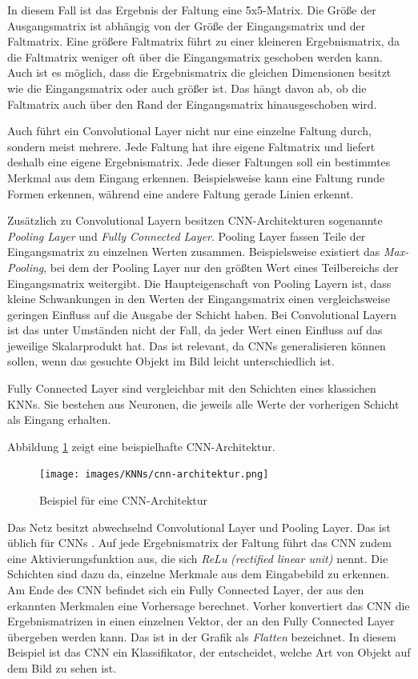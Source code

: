 In diesem Fall ist das Ergebnis der Faltung eine 5x5-Matrix. Die Größe der Ausgangsmatrix ist abhängig von der Größe der Eingangsmatrix und der Faltmatrix. Eine größere Faltmatrix führt zu einer kleineren Ergebnismatrix, da die Faltmatrix weniger oft über die Eingangsmatrix geschoben werden kann. Auch ist es möglich, dass die Ergebnismatrix die gleichen Dimensionen besitzt wie die Eingangsmatrix oder auch größer ist. Das hängt davon ab, ob die Faltmatrix auch über den Rand der Eingangsmatrix hinausgeschoben wird. \cite{knnsKompakt}

Auch führt ein Convolutional Layer nicht nur eine einzelne Faltung durch, sondern meist mehrere. Jede Faltung hat ihre eigene Faltmatrix und liefert deshalb eine eigene Ergebnismatrix. Jede dieser Faltungen soll ein bestimmtes Merkmal aus dem Eingang erkennen. Beispielsweise kann eine Faltung runde Formen erkennen, während eine andere Faltung gerade Linien erkennt. 

Zusätzlich zu Convolutional Layern besitzen \ac{CNN}-Architekturen sogenannte \emph{Pooling Layer} und \emph{Fully Connected Layer}. Pooling Layer fassen Teile der Eingangsmatrix zu einzelnen Werten zusammen. Beispielsweise existiert das \emph{Max-Pooling}, bei dem der Pooling Layer nur den größten Wert eines Teilbereichs der Eingangsmatrix weitergibt. Die Haupteigenschaft von Pooling Layern ist, dass kleine Schwankungen in den Werten der Eingangsmatrix einen vergleichsweise geringen Einfluss auf die Ausgabe der Schicht haben. Bei Convolutional Layern ist das unter Umständen nicht der Fall, da jeder Wert einen Einfluss auf das jeweilige Skalarprodukt hat. Das ist relevant, da \acp{CNN} generalisieren können sollen, wenn das gesuchte Objekt im Bild leicht unterschiedlich ist. \cite{DeepLearningBook}

Fully Connected Layer sind vergleichbar mit den Schichten eines klassichen \acp{KNN}. Sie bestehen aus Neuronen, die jeweils alle Werte der vorherigen Schicht als Eingang erhalten. \cite{DeepLearningBook}

Abbildung \ref{fig:cnn-architecture} zeigt eine beispielhafte \ac{CNN}-Architektur. 
\begin{figure}[h]
   \centering
   \texttt{[image: images/KNNs/cnn-architektur.png]}
   \caption{Beispiel für eine \ac{CNN}-Architektur \emph{\cite{cnn-architektur-img}}}
   \label{fig:cnn-architecture}
\end{figure}
Das Netz besitzt abwechselnd Convolutional Layer und Pooling Layer. Das ist üblich für \acp{CNN} \cite{DeepLearningBook}. Auf jede Ergebnismatrix der Faltung führt das \ac{CNN} zudem eine Aktivierungsfunktion aus, die sich \emph{ReLu} \emph{(rectified linear unit)} nennt. Die Schichten sind dazu da, einzelne Merkmale aus dem Eingabebild zu erkennen. Am Ende des \ac{CNN} befindet sich ein Fully Connected Layer, der aus den erkannten Merkmalen eine Vorhersage berechnet. Vorher konvertiert das \ac{CNN} die Ergebnismatrizen in einen einzelnen Vektor, der an den Fully Connected Layer übergeben werden kann. Das ist in der Grafik als \emph{Flatten} bezeichnet. In diesem Beispiel ist das \ac{CNN} ein Klassifikator, der entscheidet, welche Art von Objekt auf dem Bild zu sehen ist.